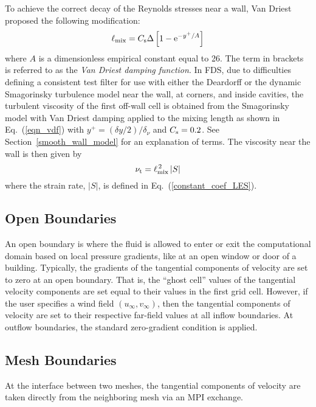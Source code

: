 To achieve the correct decay of the Reynolds stresses near a wall, Van Driest~\cite{Wilcox:1} proposed the following modification:
\begin{equation}
\label{eqn_vdf}
\ell_{\rm mix} = C_{\rm s} \Delta \left[ 1 - \mathrm{e}^{-y^+/A} \right]
\end{equation}
where $A$ is a dimensionless empirical constant equal to 26.  The term in brackets is referred to as the {\em Van Driest damping function}. In FDS, due to difficulties defining a consistent test filter for use with either the Deardorff or the dynamic Smagorinsky turbulence model near the wall, at corners, and inside cavities, the turbulent viscosity of the first off-wall cell is obtained from the Smagorinsky model with Van Driest damping applied to the mixing length as shown in Eq.~(\ref{eqn_vdf}) with $y^+ = (\delta y/2)/\delta_\nu$ and $C_{\rm s} = 0.2$.  See Section~\ref{smooth_wall_model} for an explanation of terms. The viscosity near the wall is then given by
\begin{equation}
   \nu_{\rm t} = \ell_{\rm mix}^{\,2}\,|S|  \label{eqn_nearwall_viscosity}
\end{equation}
where the strain rate, $|S|$, is defined in Eq.~(\ref{constant_coef_LES}).

\subsection{Open Boundaries}

An open boundary is where the fluid is allowed to enter or exit the computational domain based on local pressure gradients, like at an open window or door of a building. Typically, the gradients of the tangential components of velocity are set to zero at an open boundary. That is, the ``ghost cell'' values of the tangential velocity components are set equal to their values in the first grid cell. However, if the user specifies a wind field $(u_\infty,v_\infty)$, then the tangential components of velocity are set to their respective far-field values at all inflow boundaries. At outflow boundaries, the standard zero-gradient condition is applied. 

\subsection{Mesh Boundaries}

At the interface between two meshes, the tangential components of velocity are taken directly from the neighboring mesh via an MPI exchange. 




